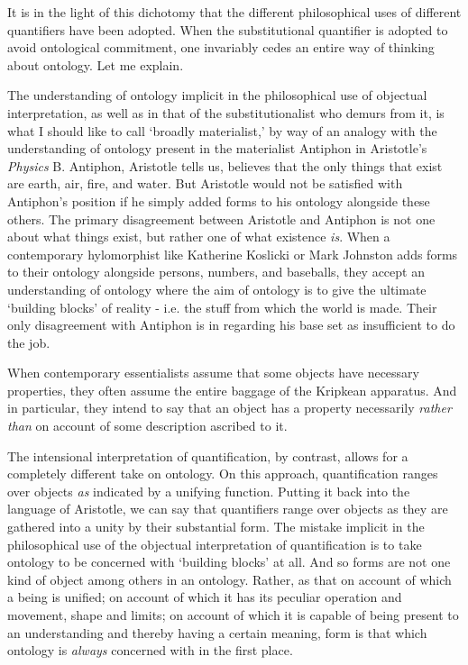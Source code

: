 \documentclass[]{article}
\begin{document}
It is in the light of this dichotomy that the different philosophical uses of different quantifiers have been adopted. When the substitutional quantifier is adopted to avoid ontological commitment, one invariably cedes an entire way of thinking about ontology. Let me explain.

The understanding of ontology implicit in the philosophical use of objectual interpretation, as well as in that of the substitutionalist who demurs from it, is what I should like to call `broadly materialist,' by way of an analogy with the understanding of ontology present in the materialist Antiphon in Aristotle's \textit{Physics} B. Antiphon, Aristotle tells us, believes that the only things that exist are earth, air, fire, and water. But Aristotle would not be satisfied with Antiphon's position if he simply added forms to his ontology alongside these others. The primary disagreement between Aristotle and Antiphon is not one about what things exist, but rather one of what existence \textit{is}. When a contemporary hylomorphist like Katherine Koslicki or Mark Johnston adds forms to their ontology alongside persons, numbers, and baseballs, they accept an understanding of ontology where the aim of ontology is to give the ultimate `building blocks' of reality - i.e. the stuff from which the world is made. Their only disagreement with Antiphon is in regarding his base set as insufficient to do the job. 

When contemporary essentialists assume that some objects have necessary properties, they often assume the entire baggage of the Kripkean apparatus. And in particular, they intend to say that an object has a property necessarily \textit{rather than} on account of some description ascribed to it. 

The intensional interpretation of quantification, by contrast, allows for a completely different take on ontology. On this approach, quantification ranges over objects \textit{as} indicated by a unifying function. Putting it back into the language of Aristotle, we can say that quantifiers range over objects as they are gathered into a unity by their substantial form. The mistake implicit in the philosophical use of the objectual interpretation of quantification is to take ontology to be concerned with `building blocks' at all. And so forms are not one kind of object among others in an ontology. Rather, as that on account of which a being is unified; on account of which it has its peculiar operation and movement, shape and limits; on account of which it is capable of being present to an understanding and thereby having a certain meaning, form is that which ontology is \textit{always} concerned with in the first place. 
\end{document}
